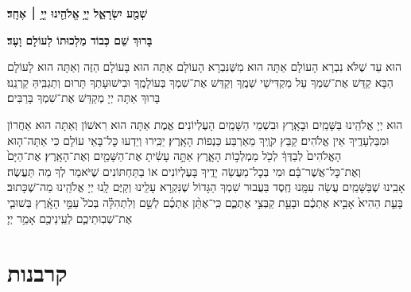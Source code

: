 \begin{Large}
	\textbf{שְׁמַ֖ע יִשְׂרָאֵ֑ל יְיָ֥ אֱלֹהֵ֖ינוּ יְיָ֥ ׀ אֶחָֽד׃}
\end{Large}

\textbf{%
	בָּרוּךְ שֵׁם כְּבוֹד מַלְכוּתוֹ לְעוֹלָם וָעֶד׃
}


הוּא עַד שֶׁלֹּא נִבְרָא הָעוֹלָם אַתָּה הוּא מִשֶּׁנִּבְרָא הָעוֹלָם \middot אַתָּה הוּא בָּעוֹלָם הַזֶּה וְאַתָּה הוּא לָעוֹלָם הַבָּא \middot קַדֵּשׁ אֶת־שִׁמְךָ עַל מַקְדִּישֵׁי שְׁמֶֽךָ וְקַדֵּשׁ אֶת־שִׁמְךָ בְּעוֹלָמֶֽךָ וּבִישׁוּעָתְךָ תָּרוּם וְתַגְבִּֽיהַּ קַרְנֵֽנוּ׃ בָּרוּךְ אַתָּה יְיָ מְקַדֵּשׁ אֶת־שִׁמְךָ בָּרַבִּים׃

הוּא יְיָ אֱלֹהֵֽינוּ בַּשָּׁמַֽיִם וּבָאָֽרֶץ וּבִשְׁמֵי הַשָּׁמַֽיִם הָעֶלְיוֹנִים׃ אֱמֶת אַתָּה הוּא רִאשׁוֹן וְאַתָּה הוּא אַחֲרוֹן וּמִבַּלְעָדֶֽיךָ אֵין אֱלֹהִים׃ קַבֵּץ קֹוֶֽיךָ מֵאַרְבַּע כַּנְפוֹת הָאָֽרֶץ׃ יַכִּֽירוּ וְיֵדְעוּ כׇּל־בָּאֵי עוֹלָם
כִּי אַתָּה־ה֤וּא הָאֱלֹהִים֙ לְבַדְּךָ֔ לְכֹ֖ל מַמְלְכ֣וֹת הָאָ֑רֶץ אַתָּ֣ה עָשִׂ֔יתָ אֶת־הַשָּׁמַ֖יִם וְאֶת־הָאָֽרֶץ׃ אֶת־הַיָּם֙ וְאֶת־כׇּל־אֲשֶׁר־בָּ֔ם׃
וּמִי בְּכׇל־מַעֲשֵׂה יָדֶֽיךָ בָּעֶלְיוֹנִים אוֹ בַתַּחְתּוֹנִים שֶׁיֹּאמַר לְךָ מַה תַּעֲשֶׂה׃\\
אָבִֽינוּ שֶׁבַּשָּׁמַֽיִם עֲשֵׂה עִמָּֽנוּ חֶֽסֶד בַּעֲבוּר שִׁמְךָ הַגָּדוֹל שֶׁנִּקְרָא עָלֵֽינוּ וְקַיֶּם לָֽנוּ יְיָ אֱלֹהֵֽינוּ מַה־שֶׁכָּתוּב׃ %
בָּעֵ֤ת הַהִיא֙ אָבִ֣יא אֶתְכֶ֔ם וּבָעֵ֖ת קַבְּצִ֣י אֶתְכֶ֑ם כִּֽי־אֶתֵּ֨ן אֶתְכֶ֜ם לְשֵׁ֣ם וְלִתְהִלָּ֗ה בְּכֹל֙ עַמֵּ֣י הָאָֽ֔רֶץ בְּשׁוּבִ֧י אֶת־שְׁבֽוּתֵיכֶ֛ם לְעֵֽינֵיכֶ֖ם אָמַ֥ר יְיָ׃

\section[קרבנות]{ קרבנות }

